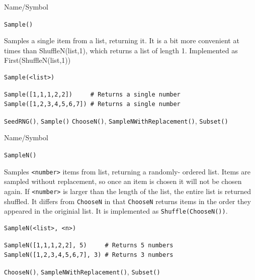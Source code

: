 \begin{desc}{Name/Symbol}
\item[Name/Symbol]  	\verb+Sample()+

\item[Description] Samples a single item from a list, returning it.
  It is a bit more convenient at times than ShuffleN(list,1), which
  returns a list of length 1.  Implemented as First(ShuffleN(list,1))


\item[Usage]       	
\begin{verbatim}
Sample(<list>)
\end{verbatim}

\item[Example]   	
\begin{verbatim}
Sample([1,1,1,2,2])     # Returns a single number
Sample([1,2,3,4,5,6,7]) # Returns a single number
\end{verbatim}

\item[See Also]    	\verb+SeedRNG()+, \verb+Sample()+ \verb+ChooseN()+, \verb+SampleNWithReplacement()+, \verb+Subset()+
\end{desc}

\begin{desc}{Name/Symbol}
\item[Name/Symbol]  	\verb+SampleN()+

\item[Description] Samples \verb+<number>+ items from list, returning
  a randomly- ordered list. Items are sampled without replacement, so
  once an item is chosen it will not be chosen again. If
  \verb+<number>+ is larger than the length of the list, the entire
  list is returned shuffled.  It differs from \verb+ChooseN+ in that
  \verb+ChooseN+ returns items in the order they appeared in the
  originial list.  It is implemented as \verb+Shuffle(ChooseN())+.

\item[Usage]       	
\begin{verbatim}
SampleN(<list>, <n>)
\end{verbatim}

\item[Example]   	
\begin{verbatim}
SampleN([1,1,1,2,2], 5)     # Returns 5 numbers
SampleN([1,2,3,4,5,6,7], 3) # Returns 3 numbers 
\end{verbatim}

\item[See Also]    	\verb+ChooseN()+, \verb+SampleNWithReplacement()+, \verb+Subset()+
\end{desc}

